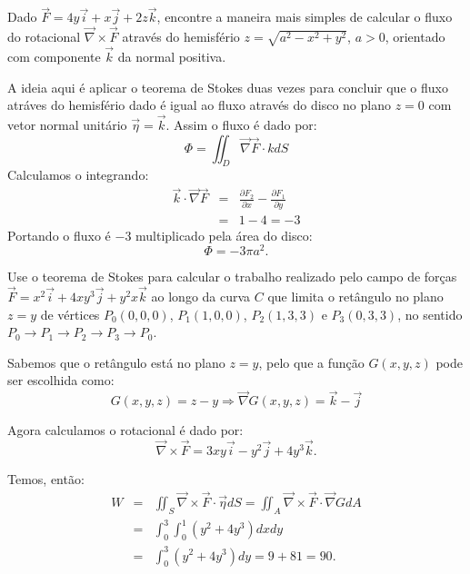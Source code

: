 \begin{exeresol}
 Dado $\vec{F}=4y\vec{i}+x\vec{j}+2z\vec{k}$, encontre a maneira mais simples de calcular o fluxo do rotacional $\vec{\nabla}\times\vec{F}$ através do hemisfério $z=\sqrt{a^2-x^2+y^2}$, $a> 0$, orientado com componente $\vec{k}$ da normal positiva.
\end{exeresol}
\begin{resol}
   A ideia aqui é aplicar o teorema de Stokes duas vezes para concluir que o fluxo atráves do hemisfério dado é igual ao fluxo através do disco no plano $z=0$ com vetor normal unitário $\vec{\eta}=\vec{k}$. Assim o fluxo é dado por:
   $$\Phi=\iint_D \vec{\nabla}\vec{F}\cdot{k}dS $$
   Calculamos o integrando:
 \begin{eqnarray*}
 \vec{k}\cdot\vec{\nabla}\vec{F} &=& \frac{\partial F_2}{\partial x} - \frac{\partial F_1}{\partial y} \\
 &=& 1-4=-3
 \end{eqnarray*}
 Portando o fluxo é $-3$ multiplicado pela área do disco:
 $$\Phi=-3\pi a^2. $$
\end{resol}
\begin{exeresol}
Use o teorema de Stokes para calcular o trabalho realizado pelo campo de forças $\vec{F}=x^2\vec{i}+4xy^3\vec{j}+y^2x\vec{k}$ ao longo da curva $C$ que limita o retângulo no plano $z=y$ de vértices $P_0(0,0,0)$, $P_1(1,0,0)$, $P_2(1,3,3)$ e $P_3(0,3,3)$, no sentido $P_0\to P_1\to P_2\to P_3\to P_0$.
\end{exeresol}
\begin{resol}
  Sabemos que o retângulo está no plano $z=y$, pelo que a função $G(x,y,z)$ pode ser escolhida como:
  $$G(x,y,z) = z-y \Longrightarrow \vec{\nabla}G(x,y,z) = \vec{k}-\vec{j}$$

 Agora calculamos o rotacional é dado por:
 $$\vec{\nabla}\times \vec{F} = 3xy\vec{i} -y^2\vec{j}+4y^3\vec{k}.$$
\end{resol}

Temos, então:
\begin{eqnarray*}
   W &=& \iint_S\vec{\nabla}\times \vec{F}\cdot \vec{\eta}dS = \iint_A\vec{\nabla}\times \vec{F}\cdot \vec{\nabla}GdA\\
   &=&\int_0^3\int_0^1\left(y^2+4y^3\right)dx dy\\
   &=&\int_0^3\left(y^2+4y^3\right)dy = 9+ 81=90.
\end{eqnarray*}



